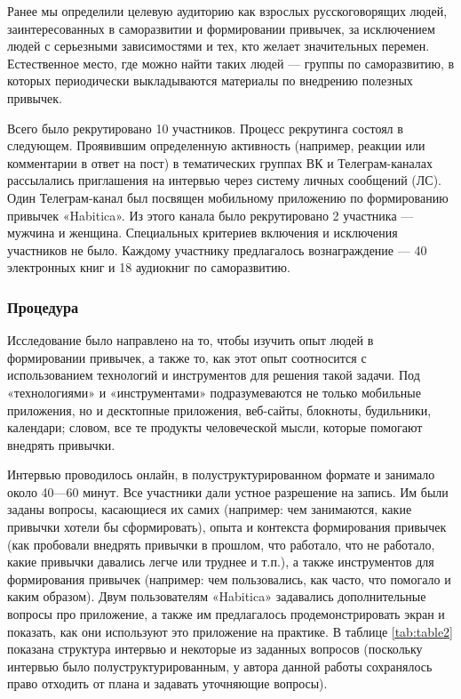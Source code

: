 \documentclass[pdflatex,sn-mathphys-num]{sn-jnl}%
\theoremstyle{thmstyleone}%
\theoremstyle{thmstyletwo}%
\theoremstyle{thmstylethree}%
\begin{document}
Ранее мы определили целевую аудиторию как взрослых русскоговорящих людей, заинтересованных в саморазвитии и формировании привычек, за исключением людей с серьезными зависимостями и тех, кто желает значительных перемен. Естественное место, где можно найти таких людей — группы по саморазвитию, в которых периодически выкладываются материалы по внедрению полезных привычек.

Всего было рекрутировано 10 участников. Процесс рекрутинга состоял в следующем. Проявившим определенную активность (например, реакции или комментарии в ответ на пост) в тематических группах ВК и Телеграм-каналах рассылались приглашения на интервью через систему личных сообщений (ЛС). Один Телеграм-канал был посвящен мобильному приложению по формированию привычек «Habitica». Из этого канала было рекрутировано 2 участника — мужчина и женщина. Специальных критериев включения и исключения участников не было. Каждому участнику предлагалось вознаграждение — 40 электронных книг и 18 аудиокниг по саморазвитию.

\subsubsection{Процедура}

Исследование было направлено на то, чтобы изучить опыт людей в формировании привычек, а также то, как этот опыт соотносится с использованием технологий и инструментов для решения такой задачи. Под «технологиями» и «инструментами» подразумеваются не только мобильные приложения, но и десктопные приложения, веб-сайты, блокноты, будильники, календари; словом, все те продукты человеческой мысли, которые помогают внедрять привычки.

Интервью проводилось онлайн, в полуструктурированном формате и занимало около 40—60 минут. Все участники дали устное разрешение на запись. Им были заданы вопросы, касающиеся их самих (например: чем занимаются, какие привычки хотели бы сформировать), опыта и контекста формирования привычек (как пробовали внедрять привычки в прошлом, что работало, что не работало, какие привычки давались легче или труднее и т.п.), а также инструментов для формирования привычек (например: чем пользовались, как часто, что помогало и каким образом). Двум пользователям «Habitica» задавались дополнительные вопросы про приложение, а также им предлагалось продемонстрировать экран и показать, как они используют это приложение на практике. В таблице \ref{tab:table2} показана структура интервью и некоторые из заданных вопросов (поскольку интервью было полуструктурированным, у автора данной работы сохранялось право отходить от плана и задавать уточняющие вопросы).
\end{document}
